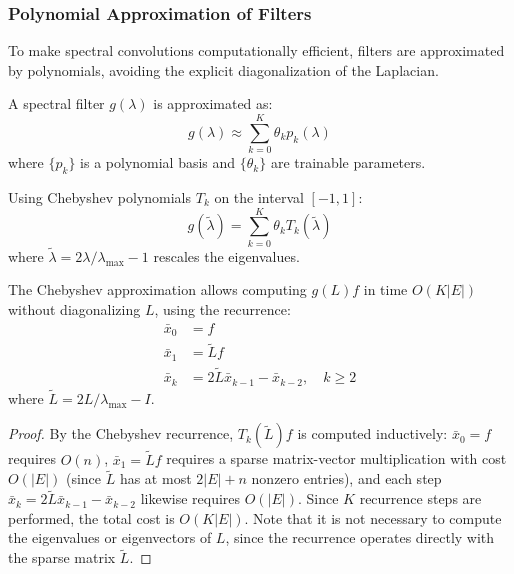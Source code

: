 \subsubsection{Polynomial Approximation of Filters}

To make spectral convolutions computationally efficient, filters are approximated by polynomials, avoiding the explicit diagonalization of the Laplacian.

\begin{definition}\label{def:filtros_polinomiales}
A spectral filter $g(\lambda)$ is approximated as:
\begin{equation}
g(\lambda) \approx \sum_{k=0}^K \theta_k p_k(\lambda)
\end{equation}
where $\{p_k\}$ is a polynomial basis and $\{\theta_k\}$ are trainable parameters.
\end{definition}

\begin{example}\label{ex:chebyshev_aproximacion}
Using Chebyshev polynomials $T_k$ on the interval $[-1, 1]$:
\begin{equation}
g(\tilde{\lambda}) = \sum_{k=0}^K \theta_k T_k(\tilde{\lambda})
\end{equation}
where $\tilde{\lambda} = 2\lambda/\lambda_{\max} - 1$ rescales the eigenvalues.
\end{example}

\begin{theorem}\label{thm:eficiencia_chebyshev}
The Chebyshev approximation allows computing $g(L)f$ in time $O(K|E|)$ without diagonalizing $L$, using the recurrence:
\begin{align}
\bar{x}_0 &= f \\
\bar{x}_1 &= \tilde{L} f \\
\bar{x}_k &= 2\tilde{L}\bar{x}_{k-1} - \bar{x}_{k-2}, \quad k \geq 2
\end{align}
where $\tilde{L} = 2L/\lambda_{\max} - I$.
\end{theorem}

\begin{proof}
By the Chebyshev recurrence, $T_k(\tilde{L})f$ is computed inductively: $\bar{x}_0 = f$ requires $O(n)$, $\bar{x}_1 = \tilde{L}f$ requires a sparse matrix-vector multiplication with cost $O(|E|)$ (since $\tilde{L}$ has at most $2|E| + n$ nonzero entries), and each step $\bar{x}_k = 2\tilde{L}\bar{x}_{k-1} - \bar{x}_{k-2}$ likewise requires $O(|E|)$. Since $K$ recurrence steps are performed, the total cost is $O(K|E|)$. Note that it is not necessary to compute the eigenvalues or eigenvectors of $L$, since the recurrence operates directly with the sparse matrix $\tilde{L}$.
\end{proof}

